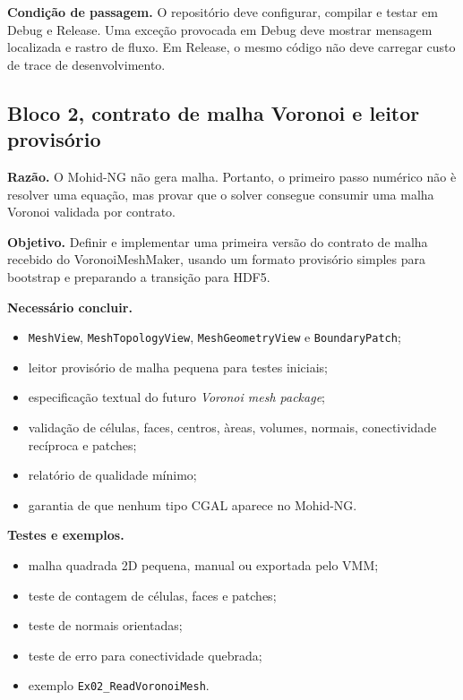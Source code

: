 \documentclass[11pt,a4paper]{article}
\begin{document}
\textbf{Condi\c{c}\~ao de passagem.} O reposit\'orio deve configurar, compilar e testar em Debug e Release. Uma exce\c{c}\~ao provocada em Debug deve mostrar mensagem localizada e rastro de fluxo. Em Release, o mesmo c\'odigo n\~ao deve carregar custo de trace de desenvolvimento.

\subsection*{Bloco 2, contrato de malha Voronoi e leitor provis\'orio}

\textbf{Raz\~ao.} O Mohid-NG n\~ao gera malha. Portanto, o primeiro passo num\'erico n\~ao \`e resolver uma equa\c{c}\~ao, mas provar que o solver consegue consumir uma malha Voronoi validada por contrato.

\textbf{Objetivo.} Definir e implementar uma primeira vers\~ao do contrato de malha recebido do VoronoiMeshMaker, usando um formato provis\'orio simples para bootstrap e preparando a transi\c{c}\~ao para HDF5.

\textbf{Necess\'ario concluir.}
\begin{itemize}
  \item \texttt{MeshView}, \texttt{MeshTopologyView}, \texttt{MeshGeometryView} e \texttt{BoundaryPatch};
  \item leitor provis\'orio de malha pequena para testes iniciais;
  \item especifica\c{c}\~ao textual do futuro \emph{Voronoi mesh package};
  \item valida\c{c}\~ao de c\'elulas, faces, centros, \`areas, volumes, normais, conectividade rec\'iproca e patches;
  \item relat\'orio de qualidade m\'inimo;
  \item garantia de que nenhum tipo CGAL aparece no Mohid-NG.
\end{itemize}

\textbf{Testes e exemplos.}
\begin{itemize}
  \item malha quadrada 2D pequena, manual ou exportada pelo VMM;
  \item teste de contagem de c\'elulas, faces e patches;
  \item teste de normais orientadas;
  \item teste de erro para conectividade quebrada;
  \item exemplo \texttt{Ex02\_ReadVoronoiMesh}.
\end{itemize}
\end{document}
